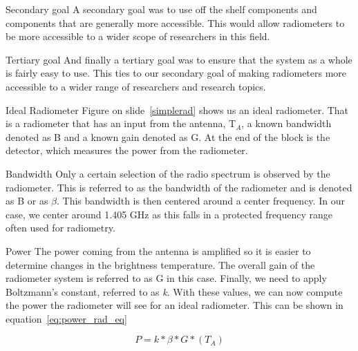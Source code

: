 \documentclass[notes]{beamer}
\begin{document}
\begin{frame}
\begin{block}{Secondary goal}
A secondary goal was to use off the shelf components and components that are generally more accessible.  This would allow radiometers to be more accessible to a wider scope of researchers in this field.
\end{block} 

\begin{block}{Tertiary goal}
And finally a tertiary goal was to ensure that the system as a whole is fairly easy to use.  This ties to our secondary goal of making radiometers more accessible to a wider range of researchers and research topics.
\end{block}
\end{frame}

\begin{frame}
\begin{block}{Ideal Radiometer}
Figure on slide~\ref{simplerad} shows us an ideal radiometer.  That is a radiometer that has an input from the antenna, T$_{A}$, a known bandwidth denoted as B and a known gain denoted as G.  At the end of the block is the detector, which measures the power from the radiometer.
\end{block}
\end{frame}

\begin{frame}
\begin{block}{Bandwidth}
Only a certain selection of the radio spectrum is observed by the radiometer.  This is referred to as the bandwidth of the radiometer and is denoted as B or as $\beta$.  This bandwidth is then centered around a center frequency.  In our case, we center around 1.405 GHz as this falls in a protected frequency range often used for radiometry.  
\end{block}
\end{frame}

\begin{frame}
\begin{block}{Power}
The power coming from the antenna is amplified so it is easier to determine changes in the brightness temperature.  The overall gain of the radiometer system is referred to as G in this case.  Finally, we need to apply Boltzmann's constant, referred to as \textit{k}.  With these values, we can now compute the power the radiometer will see for an ideal radiometer.  This can be shown in equation~\ref{eq:power_rad_eq}

\begin{equation} \label{eq:power_rad_eq}
P=k*\beta*G*(T_{A})
\end{equation}
\end{block}

\end{frame}
\end{document}
